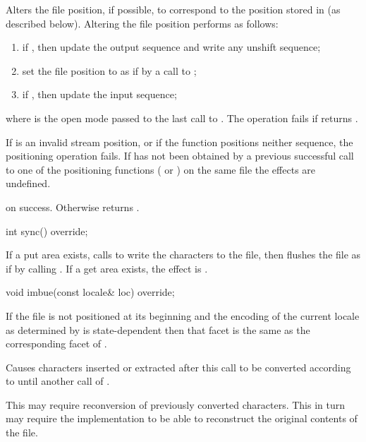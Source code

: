 \begin{itemdescr}
\pnum
Alters the file position, if possible, to correspond to the position
stored in  (as described below).
Altering the file position performs as follows:
\begin{enumerate}
\item
if
,
then update the output sequence and
write any unshift sequence;
\item
set the file position to  as if by a call to ;
\item
if
,
then update the input sequence;
\end{enumerate}
where  is the open mode passed to the last call to
.
The operation fails if
returns .

\pnum
If  is an invalid stream position, or if the function positions
neither sequence, the positioning operation fails.
If  has not been obtained by a previous successful call to one of
the positioning functions
(
or
)
on the same file the effects are undefined.

\pnum
\returns
{}
on success.
Otherwise returns
.
\end{itemdescr}

%
\begin{itemdecl}
int sync() override;
\end{itemdecl}

\begin{itemdescr}
\pnum
\effects
If a put area exists, calls
to write the characters to the file,
then flushes the file as if by calling .
If a get area exists, the effect is .
\end{itemdescr}

%
\begin{itemdecl}
void imbue(const locale& loc) override;
\end{itemdecl}

\begin{itemdescr}
\pnum
\requires
If the file is not positioned at its beginning and the encoding of the current
locale as determined by
is state-dependent
then that facet is the same as
the corresponding facet of .

\pnum
\effects
Causes characters inserted or extracted after this call
to be converted according to  until another call of
.

\pnum
\remarks
This may require reconversion of previously converted characters.
This in turn may require the implementation to be able to reconstruct
the original contents of the file.
\end{itemdescr}


